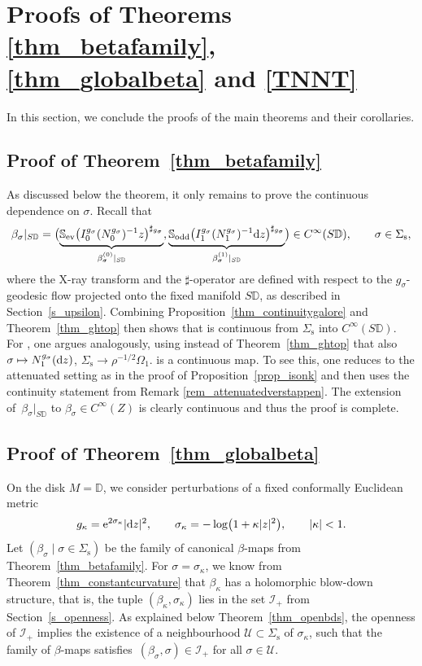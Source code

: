 \documentclass[10pt,a4paper]{amsart}
\numberwithin{equation}{section}
\theoremstyle{definition}
\newcommand{\DD}{\mathbb{D}} %
\newcommand{\1}{{\bf 1}}
\begin{document}
\section[Proofs of Theorems 3.8, 1.3 and 1.4]{Proofs of Theorems \ref{thm_betafamily}, \ref{thm_globalbeta} and \ref{TNNT}}\label{s_tnnt}

In this section, we conclude the proofs of the main theorems and their corollaries.

\subsection{Proof of Theorem~\ref{thm_betafamily}} \label{s_proof_betafamily}
As discussed below the theorem, it only remains to prove the continuous dependence on $\sigma$. Recall that
\[
	\beta_\sigma|_{S\DD} = \bigl(\underbrace{\mathbb S_\mathrm{ev}\bigl( I_0^{g_\sigma}(N_0^{g_\sigma})^{-1}z\bigr)^{\sharp_{g_\sigma}}}_{\beta^{(0)}_\sigma|_{S\DD}}
	, \underbrace{\mathbb S_\mathrm{odd} \bigl( I_1^{g_\sigma}(N_1^{g_\sigma})^{-1}{\rm d}z\bigr)^{\sharp_{g_\sigma}}}_{\beta^{(1)}_\sigma|_{S\DD}} \bigr) \in C^\infty(S\DD),\qquad \sigma\in \Sigma_\mathrm{s},
\]
where the X-ray transform and the $\sharp$-operator are defined with respect to the $g_\sigma$-geodesic flow projected onto the fixed manifold $S\DD$, as described in Section~\ref{s_upsilon}. Combining Proposition~\ref{thm_continuitygalore} and Theorem~\ref{thm_ghtop} then shows that  is continuous from $\Sigma_\mathrm{s}$ into $C^\infty(S\DD)$. For , one argues analogously, using instead of Theorem~\ref{thm_ghtop} that also
$\sigma\mapsto N_1^{g_{\sigma}}({\rm d}z)$, $ \Sigma_\mathrm{s} \to \rho^{-1/2}\Omega_1$.
is a continuous map. To see this, one reduces to the attenuated setting as in the proof of Proposition~\ref{prop_isonk} and then uses the continuity statement from Remark \ref{rem_attenuatedverstappen}.
The extension of~$\beta_\sigma|_{S \DD}$ to $\beta_\sigma \in C^\infty(Z)$ is clearly continuous and thus the proof is complete.




\subsection[Proof of Theorem 1.3]{Proof of Theorem~\ref{thm_globalbeta}} \label{proof_globalbeta}
On the disk $M=\DD$, we consider perturbations of a fixed conformally Euclidean metric
\[
	g_\kappa = {\rm e}^{2\sigma_\kappa}|{\rm d}z|^2,\qquad \sigma_\kappa=-\log\bigl(1+\kappa|z|^2\bigr),\qquad |\kappa|<1.
\]
Let $(\beta_\sigma\mid \sigma\in \Sigma_\mathrm{s})$ be the family of canonical $\beta$-maps from Theorem~\ref{thm_betafamily}. For $\sigma=\sigma_\kappa$, we know from Theorem~\ref{thm_constantcurvature} that $\beta_\kappa$ has a holomorphic blow-down structure, that is, the tuple $(\beta_\kappa,\sigma_\kappa)$ lies in the set $\mathcal I_+$ from Section~\ref{s_openness}. As explained below Theorem~\ref{thm_openbds}, the openness of $\mathcal I_+$ implies the existence of a neighbourhood $\mathcal U\subset \Sigma_\mathrm{s}$ of $\sigma_\kappa$, such that the family of $\beta$-maps satisfies~$
	(\beta_\sigma,\sigma)\in \mathcal I_+$ for all $\sigma\in \mathcal U.
$
\end{document}
